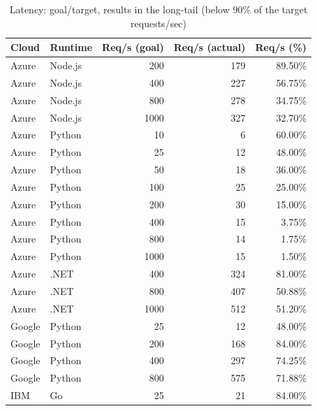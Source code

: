
\renewcommand{\arraystretch}{1.2}
\begin{table}[!t]
\scriptsize
\centering
\caption{Latency: goal/target, results in the long-tail (below 90\% of the target requests/sec)}
\begin{tabular}{l|l|r|r|r} 
\textbf{Cloud} & \textbf{Runtime} & \textbf{Req/s (goal)} & \textbf{Req/s (actual)} & \textbf{Req/s (\%)} \\ \hline
Azure & Node.js & 200 & 179 & 89.50\% \\ \hline
Azure & Node.js & 400 & 227 & 56.75\% \\ \hline
Azure & Node.js & 800 & 278 & 34.75\% \\ \hline
Azure & Node.js & 1000 & 327 & 32.70\% \\ \hline
Azure & Python & 10 & 6 & 60.00\% \\ \hline
Azure & Python & 25 & 12 & 48.00\% \\ \hline
Azure & Python & 50 & 18 & 36.00\% \\ \hline
Azure & Python & 100 & 25 & 25.00\% \\ \hline
Azure & Python & 200 & 30 & 15.00\% \\ \hline
Azure & Python & 400 & 15 & 3.75\% \\ \hline
Azure & Python & 800 & 14 & 1.75\% \\ \hline
Azure & Python & 1000 & 15 & 1.50\% \\ \hline
Azure & .NET & 400 & 324  & 81.00\% \\ \hline
Azure & .NET & 800 & 407 & 50.88\% \\ \hline
Azure & .NET & 1000 & 512 & 51.20\% \\ \hline
Google & Python & 25 & 12 & 48.00\% \\ \hline
Google & Python & 200 & 168 & 84.00\% \\ \hline
Google & Python & 400 & 297 & 74.25\% \\ \hline
Google & Python & 800 & 575 & 71.88\% \\ \hline
IBM & Go & 25 &  21 & 84.00\% \\ \hline
\end{tabular}
\label{table:rps}
\vspace{-15pt}
\end{table}

